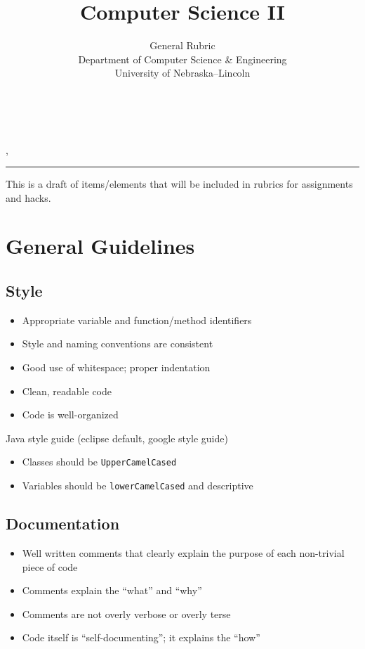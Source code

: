 \documentclass[12pt]{scrartcl}
\title{Computer Science II}\let\Title\@title
\subtitle{General Rubric\\
{\small
\vskip1cm
Department of Computer Science \& Engineering \\
University of Nebraska--Lincoln}
\vskip-1cm}
\date{~}
\begin{document}
\maketitle

\newwatermark[allpages=true,scale=5,textmark=Draft\\Draft\\Draft\\Draft,color=gray!15,]{},

\hrule

This is a draft of items/elements that will be included in rubrics for
assignments and hacks.

\section*{General Guidelines}

\subsection*{Style}
\begin{itemize}
  \item Appropriate variable and function/method identifiers
  \item Style and naming conventions are consistent
  \item Good use of whitespace; proper indentation
  \item Clean, readable code
  \item Code is well-organized
\end{itemize}

Java style guide (eclipse default, google style guide)

\begin{itemize}
  \item Classes should be \texttt{UpperCamelCased}
  \item Variables should be \texttt{lowerCamelCased} and descriptive
\end{itemize}

\subsection*{Documentation}
\begin{itemize}
  \item Well written comments that clearly explain the purpose of each non-trivial piece of code
  \item Comments explain the ``what'' and ``why''
  \item Comments are not overly verbose or overly terse
  \item Code itself is ``self-documenting''; it explains the ``how''
\end{itemize}
\end{document}

